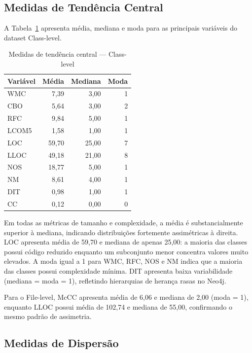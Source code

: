 \documentclass[12pt]{article}
\begin{document}
\subsection{Medidas de Tendência Central}

A Tabela~\ref{tab:tendencia_class} apresenta média, mediana e moda para as principais variáveis do dataset Class-level.

\begin{table}[H]
\centering
\caption{Medidas de tendência central --- Class-level}
\label{tab:tendencia_class}
\footnotesize
\begin{tabular}{lrrr}
\toprule
\textbf{Variável} & \textbf{Média} & \textbf{Mediana} & \textbf{Moda} \\
\midrule
WMC   &  7,39  &  3,00  &  1 \\
CBO   &  5,64  &  3,00  &  2 \\
RFC   &  9,84  &  5,00  &  1 \\
LCOM5 &  1,58  &  1,00  &  1 \\
LOC   & 59,70  & 25,00  &  7 \\
LLOC  & 49,18  & 21,00  &  8 \\
NOS   & 18,77  &  5,00  &  1 \\
NM    &  8,61  &  4,00  &  1 \\
DIT   &  0,98  &  1,00  &  1 \\
CC    &  0,12  &  0,00  &  0 \\
\bottomrule
\end{tabular}
\end{table}

Em todas as métricas de tamanho e complexidade, a média é substancialmente superior à mediana, indicando distribuições fortemente assimétricas à direita. LOC apresenta média de 59,70 e mediana de apenas 25,00: a maioria das classes possui código reduzido enquanto um subconjunto menor concentra valores muito elevados. A moda igual a 1 para WMC, RFC, NOS e NM indica que a maioria das classes possui complexidade mínima. DIT apresenta baixa variabilidade (mediana = moda = 1), refletindo hierarquias de herança rasas no Neo4j.

Para o File-level, McCC apresenta média de 6,06 e mediana de 2,00 (moda = 1), enquanto LLOC possui média de 102,74 e mediana de 55,00, confirmando o mesmo padrão de assimetria.

\subsection{Medidas de Dispersão}
\end{document}
